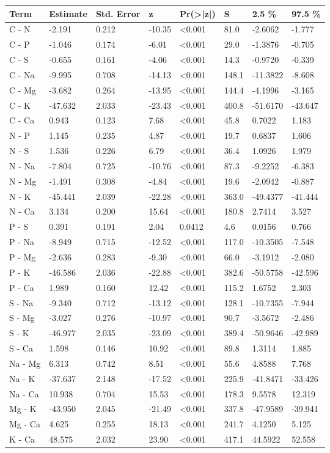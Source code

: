 
\begin{tabular}[t]{llllllll}
\toprule
Term & Estimate & Std. Error & z & Pr(>|z|) & S & 2.5 \% & 97.5 \%\\
\midrule
C - N & -2.191 & 0.212 & -10.35 & <0.001 & 81.0 & -2.6062 & -1.777\\
C - P & -1.046 & 0.174 & -6.01 & <0.001 & 29.0 & -1.3876 & -0.705\\
C - S & -0.655 & 0.161 & -4.06 & <0.001 & 14.3 & -0.9720 & -0.339\\
C - Na & -9.995 & 0.708 & -14.13 & <0.001 & 148.1 & -11.3822 & -8.608\\
C - Mg & -3.682 & 0.264 & -13.95 & <0.001 & 144.4 & -4.1996 & -3.165\\
C - K & -47.632 & 2.033 & -23.43 & <0.001 & 400.8 & -51.6170 & -43.647\\
C - Ca & 0.943 & 0.123 & 7.68 & <0.001 & 45.8 & 0.7022 & 1.183\\
N - P & 1.145 & 0.235 & 4.87 & <0.001 & 19.7 & 0.6837 & 1.606\\
N - S & 1.536 & 0.226 & 6.79 & <0.001 & 36.4 & 1.0926 & 1.979\\
N - Na & -7.804 & 0.725 & -10.76 & <0.001 & 87.3 & -9.2252 & -6.383\\
N - Mg & -1.491 & 0.308 & -4.84 & <0.001 & 19.6 & -2.0942 & -0.887\\
N - K & -45.441 & 2.039 & -22.28 & <0.001 & 363.0 & -49.4377 & -41.444\\
N - Ca & 3.134 & 0.200 & 15.64 & <0.001 & 180.8 & 2.7414 & 3.527\\
P - S & 0.391 & 0.191 & 2.04 & 0.0412 & 4.6 & 0.0156 & 0.766\\
P - Na & -8.949 & 0.715 & -12.52 & <0.001 & 117.0 & -10.3505 & -7.548\\
P - Mg & -2.636 & 0.283 & -9.30 & <0.001 & 66.0 & -3.1912 & -2.080\\
P - K & -46.586 & 2.036 & -22.88 & <0.001 & 382.6 & -50.5758 & -42.596\\
P - Ca & 1.989 & 0.160 & 12.42 & <0.001 & 115.2 & 1.6752 & 2.303\\
S - Na & -9.340 & 0.712 & -13.12 & <0.001 & 128.1 & -10.7355 & -7.944\\
S - Mg & -3.027 & 0.276 & -10.97 & <0.001 & 90.7 & -3.5672 & -2.486\\
S - K & -46.977 & 2.035 & -23.09 & <0.001 & 389.4 & -50.9646 & -42.989\\
S - Ca & 1.598 & 0.146 & 10.92 & <0.001 & 89.8 & 1.3114 & 1.885\\
Na - Mg & 6.313 & 0.742 & 8.51 & <0.001 & 55.6 & 4.8588 & 7.768\\
Na - K & -37.637 & 2.148 & -17.52 & <0.001 & 225.9 & -41.8471 & -33.426\\
Na - Ca & 10.938 & 0.704 & 15.53 & <0.001 & 178.3 & 9.5578 & 12.319\\
Mg - K & -43.950 & 2.045 & -21.49 & <0.001 & 337.8 & -47.9589 & -39.941\\
Mg - Ca & 4.625 & 0.255 & 18.13 & <0.001 & 241.7 & 4.1250 & 5.125\\
K - Ca & 48.575 & 2.032 & 23.90 & <0.001 & 417.1 & 44.5922 & 52.558\\
\bottomrule
\end{tabular}
